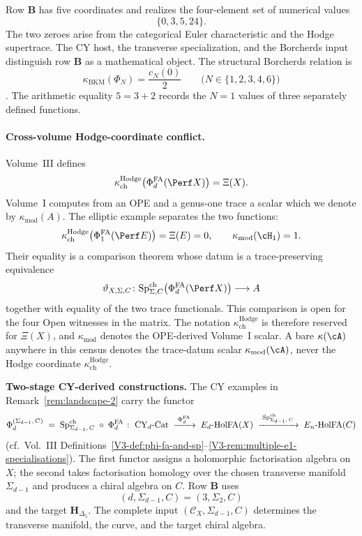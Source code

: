 Row \(\mathbf B\) has five coordinates and realizes the four-element
set of numerical values
\[
\{0,3,5,24\}.
\]
The two zeroes arise from the categorical Euler characteristic and
the Hodge supertrace.  The CY host, the transverse specialization,
and the Borcherds input distinguish row \(\mathbf B\) as a
mathematical object.  The structural Borcherds relation is
\[
\kappa_{\mathrm{BKM}}(\Phi_N)=\frac{c_N(0)}2
\qquad
\bigl(N\in\{1,2,3,4,6\}\bigr)
\]
\cite{Borcherds1998,Gritsenko1999}.  The arithmetic equality
\(5=3+2\) records the \(N=1\) values of three separately defined
functions.

\paragraph{Cross-volume Hodge-coordinate conflict.}
Volume~III defines
\[
\kappa_{\mathrm{ch}}^{\mathrm{Hodge}}
\bigl(\PhiFA_d(\Perf X)\bigr)=\Xi(X).
\]
Volume~I computes from an OPE and a genus-one trace a scalar which we
denote by \(\kappa_{\mathrm{mod}}(A)\).  The elliptic example separates
the two functions:
\[
\kappa_{\mathrm{ch}}^{\mathrm{Hodge}}
\bigl(\PhiFA_1(\Perf E)\bigr)=\Xi(E)=0,
\qquad
\kappa_{\mathrm{mod}}(\cH_1)=1.
\]
Their equality is a comparison theorem whose datum is a
trace-preserving equivalence
\[
\vartheta_{X,\Sigma,C}\colon
\SpCh_{\Sigma,C}\bigl(\PhiFA_d(\Perf X)\bigr)
\longrightarrow A
\]
together with equality of the two trace functionals.  This comparison
is open for the four Open witnesses in the matrix.  The notation
\(\kappa_{\mathrm{ch}}^{\mathrm{Hodge}}\) is therefore reserved for
\(\Xi(X)\), and \(\kappa_{\mathrm{mod}}\) denotes the OPE-derived
Volume~I scalar.  A bare \(\kappa(\cA)\) anywhere in this census
denotes the trace-datum scalar \(\kappa_{\mathrm{mod}}(\cA)\), never
the Hodge coordinate \(\kappa_{\mathrm{ch}}^{\mathrm{Hodge}}\).

\medskip

\noindent\textbf{Two-stage CY-derived constructions.}
The CY examples in Remark~\ref{rem:landscape-2} carry the functor
\[
 \Phi_d^{(\Sigma_{d-1},\,C)}
 \;=\;
 \mathrm{Sp}^{\mathrm{ch}}_{\Sigma_{d-1},\,C}\;\circ\;\Phi^{\mathrm{FA}}_d
 \;\colon\;
 \mathrm{CY}_d\text{-}\mathrm{Cat}
 \;\xrightarrow{\;\Phi^{\mathrm{FA}}_d\;}\;
 E_d\text{-}\mathrm{HolFA}(X)
 \;\xrightarrow{\;\mathrm{Sp}^{\mathrm{ch}}_{\Sigma_{d-1},\,C}\;}\;
 E_n\text{-}\mathrm{HolFA}(C)
\]
(cf.\ Vol.~III
Definitions~\ref{V3-def:phi-fa-and-sp}--\ref{V3-rem:multiple-e1-specialisations}).
The first functor assigns a holomorphic factorisation algebra on
\(X\); the second takes factorisation homology over the chosen
transverse manifold \(\Sigma_{d-1}\) and produces a chiral algebra on
\(C\).  Row \(\mathbf B\) uses
\[
(d,\Sigma_{d-1},C)=(3,\Sigma_2,C)
\]
and the target \(\mathbf H_{\Delta_5}\).  The complete input
\((\mathcal C_X,\Sigma_{d-1},C)\) determines the transverse manifold,
the curve, and the target chiral algebra.

